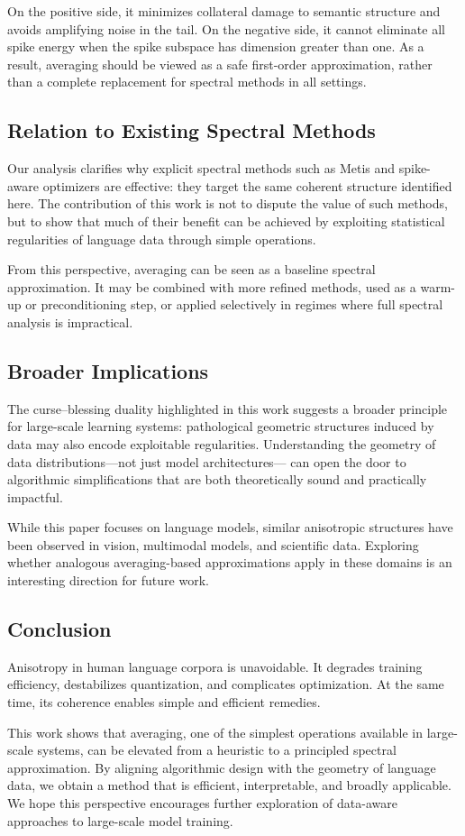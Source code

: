 On the positive side, it minimizes collateral damage to semantic structure and
avoids amplifying noise in the tail.
On the negative side, it cannot eliminate all spike energy when the spike
subspace has dimension greater than one.
As a result, averaging should be viewed as a safe first-order approximation,
rather than a complete replacement for spectral methods in all settings.

\subsection{Relation to Existing Spectral Methods}

Our analysis clarifies why explicit spectral methods such as Metis and
spike-aware optimizers are effective: they target the same coherent structure
identified here.
The contribution of this work is not to dispute the value of such methods, but
to show that much of their benefit can be achieved by exploiting statistical
regularities of language data through simple operations.

From this perspective, averaging can be seen as a baseline spectral
approximation.
It may be combined with more refined methods, used as a warm-up or
preconditioning step, or applied selectively in regimes where full spectral
analysis is impractical.

\subsection{Broader Implications}

The curse–blessing duality highlighted in this work suggests a broader principle
for large-scale learning systems:
pathological geometric structures induced by data may also encode exploitable
regularities.
Understanding the geometry of data distributions—not just model architectures—
can open the door to algorithmic simplifications that are both theoretically
sound and practically impactful.

While this paper focuses on language models, similar anisotropic structures have
been observed in vision, multimodal models, and scientific data.
Exploring whether analogous averaging-based approximations apply in these
domains is an interesting direction for future work.

\subsection{Conclusion}

Anisotropy in human language corpora is unavoidable.
It degrades training efficiency, destabilizes quantization, and complicates
optimization.
At the same time, its coherence enables simple and efficient remedies.

This work shows that averaging, one of the simplest operations available in
large-scale systems, can be elevated from a heuristic to a principled spectral
approximation.
By aligning algorithmic design with the geometry of language data, we obtain a
method that is efficient, interpretable, and broadly applicable.
We hope this perspective encourages further exploration of data-aware
approaches to large-scale model training.